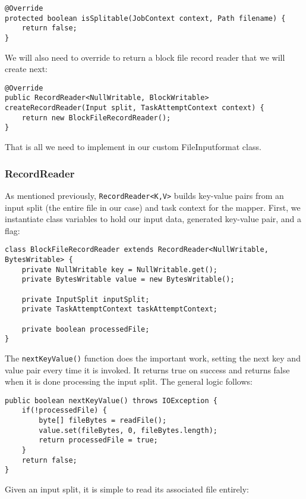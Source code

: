 \documentclass[9pt,twocolumn,twoside]{idsi}
\begin{document}
\lstset{language=Java}
\begin{lstlisting}
@Override
protected boolean isSplitable(JobContext context, Path filename) {
    return false;
}
\end{lstlisting}

We will also need to override  to return a block file record reader that we will create next:

\begin{lstlisting}
@Override
public RecordReader<NullWritable, BlockWritable> createRecordReader(Input split, TaskAttemptContext context) {
    return new BlockFileRecordReader();
}
\end{lstlisting}

That is all we need to implement in our custom FileInputformat class.

\subsubsection{RecordReader}
As mentioned previously, \lstinline{RecordReader<K,V>} builds key-value pairs from an input split (the entire file in our case) and task context for the mapper. First, we instantiate class variables to hold our input data, generated key-value pair, and a flag:

\begin{lstlisting}
class BlockFileRecordReader extends RecordReader<NullWritable, BytesWritable> {
    private NullWritable key = NullWritable.get();
    private BytesWritable value = new BytesWritable();

    private InputSplit inputSplit;
    private TaskAttemptContext taskAttemptContext;

    private boolean processedFile;
}
\end{lstlisting}

The \lstinline{nextKeyValue()} function does the important work, setting the next key and value pair every time it is invoked. It returns true on success and returns false when it is done processing the input split. The general logic follows:

\begin{lstlisting}
public boolean nextKeyValue() throws IOException {
    if(!processedFile) {
        byte[] fileBytes = readFile();
        value.set(fileBytes, 0, fileBytes.length);
        return processedFile = true;
    }
    return false;
}
\end{lstlisting}

Given an input split, it is simple to read its associated file entirely:
\end{document}
